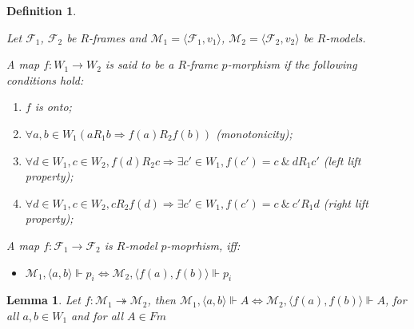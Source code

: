 \documentclass[a4paper]{article}
\theoremstyle{defin}
\newtheorem{defin}{Definition}
\theoremstyle{theorem}
\theoremstyle{prop}
\theoremstyle{lemma}
\newtheorem{lemma}{Lemma}
\theoremstyle{ex}
\theoremstyle{col}
\begin{document}
\begin{defin}
  $ $

  Let $\mathcal{F}_1$, $\mathcal{F}_2$ be $R$-frames and
  $\mathcal{M}_1 = \langle \mathcal{F}_1, v_1 \rangle$, $\mathcal{M}_2 = \langle \mathcal{F}_2, v_2 \rangle$
  be $R$-models.

  A map $f : W_1 \to W_2$ is said to be a $R$-frame $p$-morphism if the following conditions hold:

  \begin{enumerate}
    \item $f$ is onto;
    \item $\forall a, b \in W_1 (a R_1 b \Rightarrow f(a) R_2 f (b))$ (monotonicity);
    \item $\forall d \in W_1, c \in W_2, f(d) R_2 c \Rightarrow \exists c' \in W_1, f(c') = c \: \& \: d R_1 c'$ (left lift property);
    \item $\forall d \in W_1, c \in W_2, c R_2 f(d) \Rightarrow \exists c' \in W_1, f(c') = c \: \& \: c' R_1 d$ (right lift property);
  \end{enumerate}

  A map $f : \mathcal{F}_1 \to \mathcal{F}_2$ is $R$-model $p$-moprhism, iff:

  \begin{itemize}
    \item $\mathcal{M}_1, \langle a, b \rangle \Vdash p_i \Leftrightarrow \mathcal{M}_2, \langle f(a), f(b) \rangle \Vdash p_i$
  \end{itemize}
\end{defin}

\begin{lemma}
  Let $f : \mathcal{M}_1 \twoheadrightarrow \mathcal{M}_2$, then
  $\mathcal{M}_1, \langle a, b \rangle \Vdash A \Leftrightarrow \mathcal{M}_2, \langle f(a), f(b) \rangle \Vdash A$,
  for all $a, b \in W_1$ and for all $A \in Fm$
\end{lemma}
\end{document}
